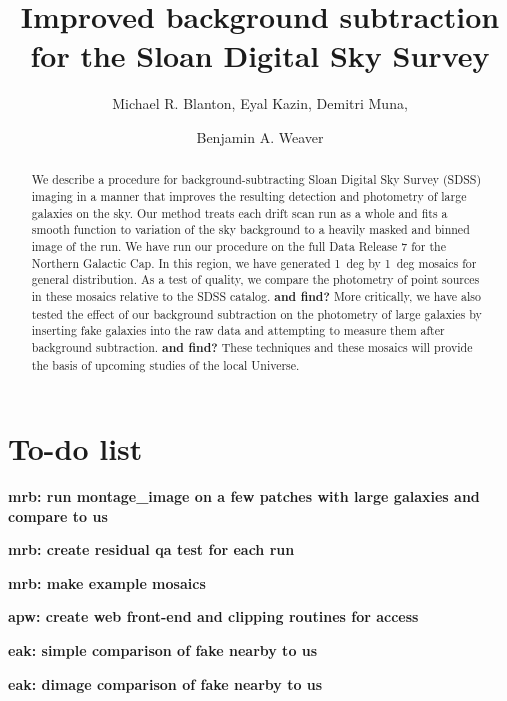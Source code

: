 \documentclass[10pt,preprint]{aastex}
\newcounter{address}
\begin{document}
\title{Improved background subtraction for the Sloan Digital Sky Survey}


\author{
Michael R. Blanton\altaffilmark{\ref{NYU}},
Eyal Kazin\altaffilmark{\ref{NYU}},
Demitri Muna\altaffilmark{\ref{NYU}}, \and
Benjamin A. Weaver\altaffilmark{\ref{NYU}}
}

\setcounter{address}{1}

\begin{abstract}
We describe a procedure for background-subtracting Sloan Digital Sky
Survey (SDSS) imaging in a manner that improves the resulting
detection and photometry of large galaxies on the sky. Our method
treats each drift scan run as a whole and fits a smooth function to
variation of the sky background to a heavily masked and binned image
of the run. We have run our procedure on the full Data Release 7 for
the Northern Galactic Cap. In this region, we have generated 1~deg by
1~deg mosaics for general distribution. As a test of quality, we
compare the photometry of point sources in these mosaics relative to
the SDSS catalog. {\bf and find?} More critically, we have also tested
the effect of our background subtraction on the photometry of large
galaxies by inserting fake galaxies into the raw data and attempting
to measure them after background subtraction. {\bf and find?} These
techniques and these mosaics will provide the basis of upcoming
studies of the local Universe.
\end{abstract}

\section{ To-do list}

{\bf mrb: run montage\_image on a few patches with large galaxies and
compare to us}

{\bf mrb: create residual qa test for each run}

{\bf mrb: make example mosaics}

{\bf apw: create web front-end and clipping routines for access}

{\bf eak: simple comparison of fake nearby to us}

{\bf eak: dimage comparison of fake nearby to us}
\end{document}
